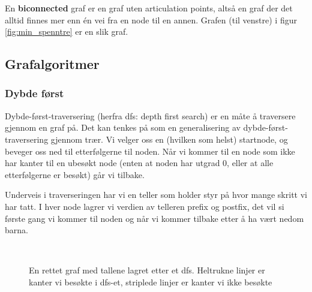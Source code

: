 En \textbf{biconnected} graf er en graf uten articulation points, altså en graf der det alltid finnes mer enn én vei fra en node til en annen. Grafen (til venstre) i figur \ref{fig:min_spenntre} er en slik graf. 

\subsection{\color{red}Grafalgoritmer}

\subsubsection{Dybde først}
\label{dfs}
Dybde-først-traversering (herfra dfs: depth first search) er en måte å traversere gjennom en graf på. Det kan tenkes på som en generalisering av dybde-først-traversering gjennom trær. Vi velger oss en (hvilken som helst) startnode, og beveger oss ned til etterfølgerne til noden. Når vi kommer til en node som ikke har kanter til en ubesøkt node (enten at noden har utgrad 0, eller at alle etterfølgerne er besøkt) går vi tilbake. 

Underveis i traverseringen har vi en teller som holder styr på hvor mange skritt vi har tatt. I hver node lagrer vi verdien av telleren prefix og postfix, det vil si første gang vi kommer til noden og når vi kommer tilbake etter å ha vært nedom barna. 

\begin{figure}[H]
\centering
\captionsetup{justification=centering,margin=1cm}
\caption{En rettet graf med tallene lagret etter et dfs. Heltrukne linjer er kanter vi besøkte i dfs-et, striplede linjer er kanter vi ikke besøkte}~\\
\label{fig:dfs}
\end{figure}

